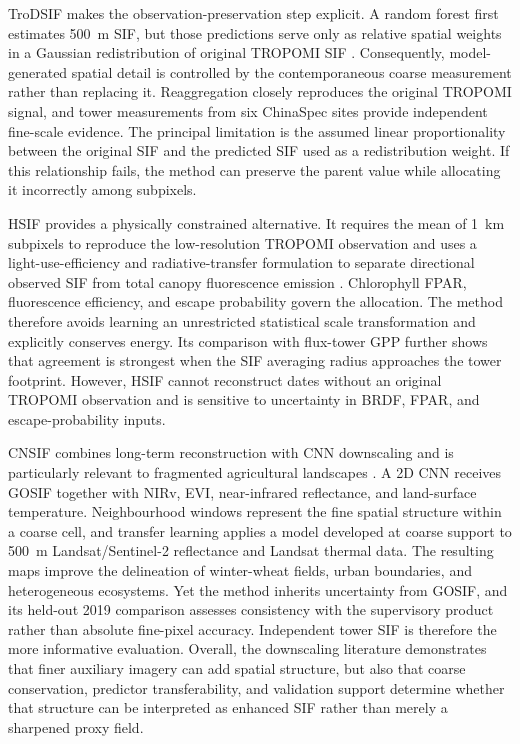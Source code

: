 TroDSIF makes the observation-preservation step explicit. A random forest first estimates 500~m SIF, but those predictions serve only as relative spatial weights in a Gaussian redistribution of original TROPOMI SIF \cite{chen2025improved}. Consequently, model-generated spatial detail is controlled by the contemporaneous coarse measurement rather than replacing it. Reaggregation closely reproduces the original TROPOMI signal, and tower measurements from six ChinaSpec sites provide independent fine-scale evidence. The principal limitation is the assumed linear proportionality between the original SIF and the predicted SIF used as a redistribution weight. If this relationship fails, the method can preserve the parent value while allocating it incorrectly among subpixels.

HSIF provides a physically constrained alternative. It requires the mean of 1~km subpixels to reproduce the low-resolution TROPOMI observation and uses a light-use-efficiency and radiative-transfer formulation to separate directional observed SIF from total canopy fluorescence emission \cite{zhang2023generating}. Chlorophyll FPAR, fluorescence efficiency, and escape probability govern the allocation. The method therefore avoids learning an unrestricted statistical scale transformation and explicitly conserves energy. Its comparison with flux-tower GPP further shows that agreement is strongest when the SIF averaging radius approaches the tower footprint. However, HSIF cannot reconstruct dates without an original TROPOMI observation and is sensitive to uncertainty in BRDF, FPAR, and escape-probability inputs.

CNSIF combines long-term reconstruction with CNN downscaling and is particularly relevant to fragmented agricultural landscapes \cite{du2025cnsif}. A 2D CNN receives GOSIF together with NIRv, EVI, near-infrared reflectance, and land-surface temperature. Neighbourhood windows represent the fine spatial structure within a coarse cell, and transfer learning applies a model developed at coarse support to 500~m Landsat/Sentinel-2 reflectance and Landsat thermal data. The resulting maps improve the delineation of winter-wheat fields, urban boundaries, and heterogeneous ecosystems. Yet the method inherits uncertainty from GOSIF, and its held-out 2019 comparison assesses consistency with the supervisory product rather than absolute fine-pixel accuracy. Independent tower SIF is therefore the more informative evaluation. Overall, the downscaling literature demonstrates that finer auxiliary imagery can add spatial structure, but also that coarse conservation, predictor transferability, and validation support determine whether that structure can be interpreted as enhanced SIF rather than merely a sharpened proxy field.

